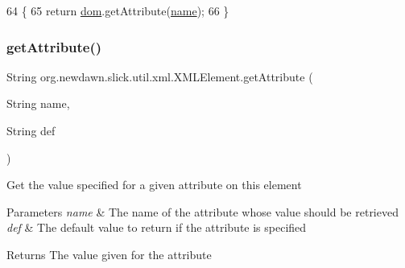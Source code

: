 \begin{DoxyCode}
64                                             \{
65         \textcolor{keywordflow}{return} \mbox{\hyperlink{classorg_1_1newdawn_1_1slick_1_1util_1_1xml_1_1_x_m_l_element_a97e3ba0c57e0822e9111fd770807e64e}{dom}}.getAttribute(\mbox{\hyperlink{classorg_1_1newdawn_1_1slick_1_1util_1_1xml_1_1_x_m_l_element_aa96123a88e2614952c4d3d1a4207560a}{name}});
66     \}
\end{DoxyCode}
\mbox{\label{classorg_1_1newdawn_1_1slick_1_1util_1_1xml_1_1_x_m_l_element_ac431b9ebad3625c91ef31361860d88c6}} 
\subsubsection{\texorpdfstring{get\+Attribute()}{getAttribute()}\hspace{0.1cm}{\footnotesize\ttfamily [2/2]}}
{\footnotesize\ttfamily String org.\+newdawn.\+slick.\+util.\+xml.\+X\+M\+L\+Element.\+get\+Attribute (\begin{DoxyParamCaption}\item[{String}]{name,  }\item[{String}]{def }\end{DoxyParamCaption})\hspace{0.3cm}{\ttfamily [inline]}}

Get the value specified for a given attribute on this element


\begin{DoxyParams}{Parameters}
{\em name} & The name of the attribute whose value should be retrieved \\
\hline
{\em def} & The default value to return if the attribute is specified \\
\hline
\end{DoxyParams}
\begin{DoxyReturn}{Returns}
The value given for the attribute 
\end{DoxyReturn}

